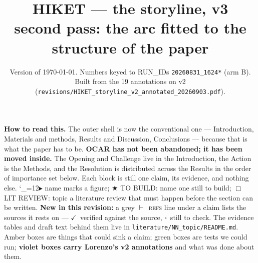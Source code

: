 \documentclass[11pt]{article}
\title{\vspace{-1.4cm}\textbf{HIKET --- the storyline, v3}\\[2pt]
\large second pass: the arc fitted to the structure of the paper}
\author{}
\date{\small Version of \today. Numbers keyed to RUN\_IDs \texttt{20260831\_1624*} (arm B).
Built from the 19 annotations on v2 (\texttt{revisions/HIKET\_storyline\_v2\_annotated\_20260903.pdf}).}
\newcommand{\FIGlabel}[1]{\textcolor{noterule}{\small$\blacktriangleright$ \textsf{#1}}}
\newcommand{\FIGX}{\begingroup\catcode`\_=12\relax\FIGXaux}
\newcommand{\FIGXaux}[1]{\FIGlabel{#1}\endgroup}
\newcommand{\NEW}[1]{\textcolor{testrule}{\small$\bigstar$ \textsf{TO BUILD: #1}}}
\newcommand{\LIT}[1]{\textcolor{lorrule}{\small$\Box$ \textsf{LIT REVIEW: #1}}}
\newcommand{\vd}{\textcolor{testrule}{$\checkmark$}}
\newcommand{\nd}{\textcolor{lorrule}{$\square$}}
\begin{document}
\maketitle

\begin{note}
\textbf{How to read this.} The outer shell is now the conventional one --- Introduction,
Materials and methods, Results and Discussion, Conclusions --- because that is what the paper has to
be. \textbf{OCAR has not been abandoned; it has been moved inside.} The Opening and Challenge live in
the Introduction, the Action is the Methods, and the Resolution is distributed across the Results in
the order of importance set below. Each block is still one claim, its evidence, and nothing else.
\FIGX{name} marks a figure; \NEW{name} one still to build; \LIT{topic} a literature review that must
happen before the section can be written. \textbf{New in this revision:} a grey $\vdash$~\textsc{refs}
line under a claim lists the sources it rests on --- \vd\ verified against the source, \nd\ still to
check. The evidence tables and draft text behind them live in \texttt{literature/NN\_topic/README.md}. Amber boxes are things that could sink a claim; green boxes
are tests we could run; \textcolor{lorrule}{\textbf{violet boxes carry Lorenzo's v2 annotations}} and
what was done about them.
\end{note}

\begin{center}
\end{center}
\end{document}
